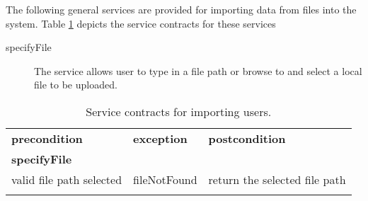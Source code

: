 The following general services are provided for importing data from files into the system. Table \ref{tab:gerealImportContracts} depicts the service contracts for these services 

\begin{description}
\item[specifyFile] The service allows user to type in a file path or browse to and select a local file to be uploaded.
\end{description}


\begin{table}[htb]
\caption{Service contracts for importing users.
\label{tab:gerealImportContracts}}
\begin{tabular}{l l l}
\hline
\noalign{\smallskip}
\textbf{precondition}&\textbf{exception} &\textbf{postcondition}\\
\noalign{\smallskip}
\hline
\textbf{specifyFile}\\
valid file path selected & fileNotFound & return the selected file path\\
\noalign{\smallskip}
\hline
\end{tabular}  
\end{table}

